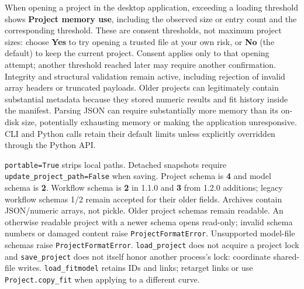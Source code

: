 \documentclass[
  10pt,
  a4paper,
  oneside]{scrreprt}
\begin{document}
When opening a project in the desktop application, exceeding a loading
threshold shows \textbf{Project memory use}, including the observed size
or entry count and the corresponding threshold. These are consent
thresholds, not maximum project sizes: choose \textbf{Yes} to try
opening a trusted file at your own risk, or \textbf{No} (the default) to
keep the current project. Consent applies only to that opening attempt;
another threshold reached later may require another confirmation.
Integrity and structural validation remain active, including rejection
of invalid array headers or truncated payloads. Older projects can
legitimately contain substantial metadata because they stored numeric
results and fit history inside the manifest. Parsing JSON can require
substantially more memory than its on-disk size, potentially exhausting
memory or making the application unresponsive. CLI and Python calls
retain their default limits unless explicitly overridden through the
Python API.

\texttt{portable=True} strips local paths. Detached snapshots require
\texttt{update\_project\_path=False} when saving. Project schema is
\textbf{4} and model schema is \textbf{2}. Workflow schema is \textbf{2}
in 1.1.0 and \textbf{3} from 1.2.0 additions; legacy workflow schemas
1/2 remain accepted for their older fields. Archives contain
JSON/numeric arrays, not pickle. Older project schemas remain readable.
An otherwise readable project with a newer schema opens read-only;
invalid schema numbers or damaged content raise
\texttt{ProjectFormatError}. Unsupported model-file schemas raise
\texttt{ProjectFormatError}. \texttt{load\_project} does not acquire a
project lock and \texttt{save\_project} does not itself honor another
process's lock: coordinate shared-file writes. \texttt{load\_fitmodel}
retains IDs and links; retarget links or use \texttt{Project.copy\_fit}
when applying to a different curve.
\end{document}

